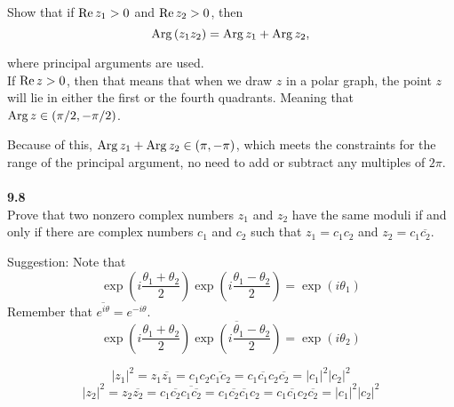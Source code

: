Show that if $\operatorname{Re}{z_1} > 0$ and $\operatorname{Re}{z_2} > 0$, then
$$
\operatorname{Arg}{(z_1 z_2)} = \operatorname{Arg}{z_1} + \operatorname{Arg}{z_2},
$$

where principal arguments are used.
\\

If $\operatorname{Re}{z} > 0$, then that means that when we draw $z$ in a polar graph, the point $z$ will lie in either the first
or the fourth quadrants.
Meaning that $\operatorname{Arg}{z} \in (\pi/2, -\pi/2)$.

Because of this, $\operatorname{Arg}{z_1} + \operatorname{Arg}{z_2} \in (\pi, -\pi)$, which meets the constraints for the range of the principal argument,
no need to add or subtract any multiples of $2\pi$.
\\~\\


\textbf{9.8}
\\

Prove that two nonzero complex numbers $z_1$ and $z_2$ have the same moduli if and only if there are complex numbers
$c_1$ and $c_2$ such that $z_1 = c_1 c_2$ and $z_2 = c_1 \overline{c_2}$.

Suggestion: Note that
$$
\exp\left(i\frac{\theta_1 + \theta_2}{2}\right) \exp\left(i\frac{\theta_1 - \theta_2}{2}\right) = \exp\left(i \theta_1 \right)
$$
Remember that $\overline{e^{i\theta}} = e^{-i\theta}$.
$$
\exp\left(i\frac{\theta_1 + \theta_2}{2}\right) \overline{
    \exp\left(i\frac{\theta_1 - \theta_2}{2}\right)
 } = \exp\left(i \theta_2 \right)
$$

$$
|z_1|^2 = z_1 \overline{z_1} = c_1 c_2 \overline{c_1 c_2} = c_1 \overline{c_1} c_2 \overline{c_2}
= |c_1|^2 |c_2|^2
$$
$$
|z_2|^2 = z_2 \overline{z_2} = c_1 \overline{c_2} \overline{c_1 \overline{c_2}} = c_1 \overline{c_2} \overline{c_1} c_2
= c_1 \overline{c_1} c_2 \overline{c_2}
= |c_1|^2 |c_2|^2
$$